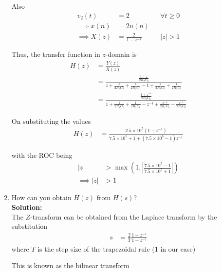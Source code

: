 \documentclass[journal,12pt,twocolumn]{IEEEtran}
\newcommand{\solution}{\noindent \textbf{Solution: }}
\providecommand{\brak}[1]{\ensuremath{\left(#1\right)}}
\providecommand{\abs}[1]{\left\vert#1\right\vert}
\numberwithin{equation}{section}
\numberwithin{figure}{section}
\renewcommand\thesection{\arabic{section}}
\begin{document}
\begin{enumerate}[label=\thesection.\arabic*,ref=\thesection.\theenumi]
			Also
			\begin{align}
				v_2(t) &= 2 &&\forall t \ge 0\\
				\implies x(n) &= 2u(n) \\
				\implies X(z) &= \frac{2}{1-z^{-1}} &&\abs{z} > 1
			\end{align}
	
			Thus, the transfer function in $z$-domain is
			\begin{align}
				H(z) &= \frac{Y(z)}{X(z)} \\
				&= \frac{\frac{1+z}{2R_2C_0}}{z + \frac{z}{2R_1C_0} + \frac{z}{2R_2C_0} - 1 + \frac{1}{2R_1C_0} + \frac{1}{2R_2C_0}} \\
				&= \frac{\frac{1 + z^{-1}}{2R_2C_0}}{1 + \frac{1}{2R_1C_0} + \frac{1}{2R_2C_0} - z^{-1} + \frac{z^{-1}}{2R_1C_0} + \frac{z^{-1}}{2R_2C_0}}
			\end{align}
	
			On substituting the values
			\begin{align}
				H(z) &= \frac{2.5\times10^5 (1+z^{-1})}{7.5\times10^5 + 1 + (7.5\times10^5 - 1)z^{-1}}
			\end{align}
	
			with the ROC being
			\begin{align}
				\abs{z} &> \max\brak{1, \abs{\frac{7.5\times10^5 - 1}{7.5\times10^5 + 1}}} \\
				\implies \abs{z} &> 1
			\end{align}

		\item How can you obtain $H(z)$ from $H(s)$?\\
	
		\solution\\
			The $Z$-transform can be obtained from the Laplace transform by the substitution
			\begin{align}
				s &= \frac{2}{T} \frac{1-z^{-1}}{1+z^{-1}}
			\end{align}
			where $T$ is the step size of the trapezoidal rule ($1$ in our case)
			
			This is known as the bilinear transform
	

\end{enumerate}
\end{document}
